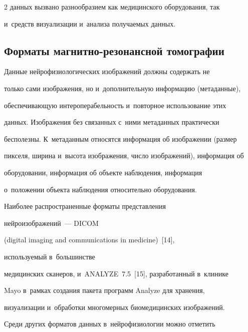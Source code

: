 \begin{multicols}{2}
данных вызвано разнообразием как медицинского оборудования, так 


и~средств визуализации и~анализа получаемых данных.





\vspace*{-4pt}


    


\subsection{Форматы магнитно-резонансной томографии}










    Данные нейрофизиологических изображений должны содержать не 


только сами изображения, но и~дополнительную информацию (метаданные), 


обеспечивающую интероперабельность и~повторное использование этих 


данных. Изображения без связанных с~ними метаданных практически 


бесполезны. К~метаданным относятся информация об изображении (размер 


пикселя, ширина и~высота изображения, число изображений), информация об 


оборудовании, информация об объекте наблюдения, информация 


о~положении объекта наблюдения относительно оборудования.


    


    Наиболее распространенные форматы пред\-став\-ле\-ния 


нейроизображений~--- DICOM


(digital imaging and communications in medicine)~[14], 


используемый в~большинстве 


медицинских сканеров, и~ANALYZE~7.5~[15], разработанный в~клинике 


Mayo в~рамках создания пакета программ Analyze для хранения, 


визуализации и~обработки многомерных биомедицинских изображений. 


Среди других форматов данных в~нейрофизиологии можно отметить 



\end{multicols}
